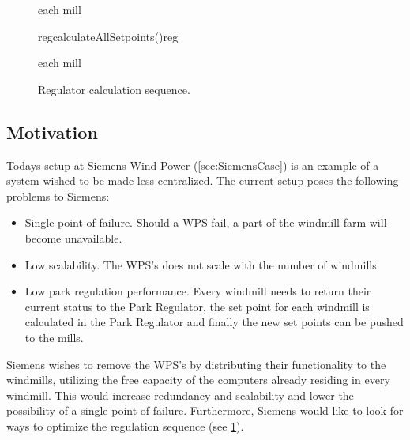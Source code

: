 \begin{figure}
	\centering
	\begin{sequencediagram} %
	
		\begin{sdblock}{each mill}{}
		\end{sdblock}
		
		\begin{call}{reg}{calculateAllSetpoints()}{reg}{}
		\end{call}
	
		\begin{sdblock}{each mill}{}
		\end{sdblock}
					
	\end{sequencediagram}

	\caption[Regulator calculation sequence]{
		\label{fig:dataComputationSequence} 
		\footnotesize{%
			Regulator calculation sequence.
		}
	}
\end{figure}

\subsection{Motivation}

Todays setup at Siemens Wind Power (\cref{sec:SiemensCase}) is an example of a system wished to be made less centralized. The current setup poses the following problems to Siemens:  

\begin{itemize} 
	\item Single point of failure. Should a WPS fail, a part of the windmill farm will become unavailable.
	\item Low scalability. The WPS's does not scale with the number of windmills.
	\item Low park regulation performance. Every windmill needs to return their current status to the Park Regulator, the set point for each windmill is calculated in the Park Regulator and finally the new set points can be pushed to the mills.
\end{itemize}

Siemens wishes to remove the WPS's by distributing their functionality to the windmills, utilizing the free capacity of the computers already residing in every windmill. This would increase redundancy and scalability and lower the possibility of a single point of failure. Furthermore, Siemens would like to look for ways to optimize the regulation sequence (see \cref{fig:dataComputationSequence}).




